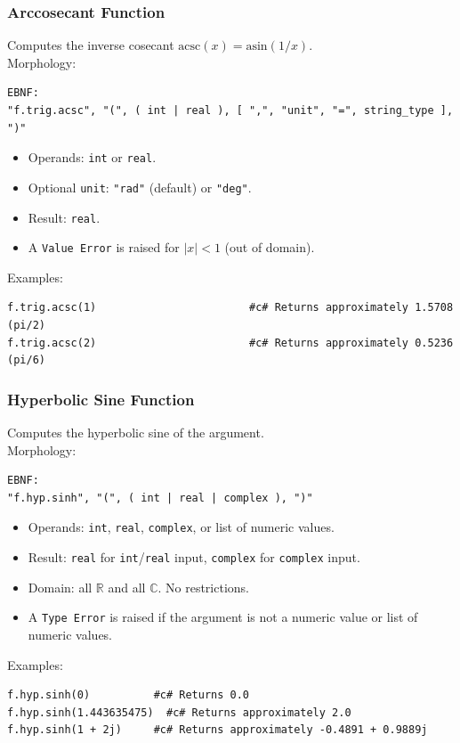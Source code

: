 \subsubsection{Arccosecant Function}
Computes the inverse cosecant $\text{acsc}(x) = \text{asin}(1/x)$. \\
Morphology:
\begin{verbatim}
EBNF:
"f.trig.acsc", "(", ( int | real ), [ ",", "unit", "=", string_type ], ")"
\end{verbatim}
\begin{itemize}
\item Operands: \texttt{int} or \texttt{real}.
\item Optional \texttt{unit}: \texttt{"rad"} (default) or \texttt{"deg"}.
\item Result: \texttt{real}.
\item A \texttt{Value Error} is raised for $|x| < 1$ (out of domain).
\end{itemize}
Examples:
\begin{verbatim}
f.trig.acsc(1)                        #c# Returns approximately 1.5708 (pi/2)
f.trig.acsc(2)                        #c# Returns approximately 0.5236 (pi/6)
\end{verbatim}

\subsubsection{Hyperbolic Sine Function}
Computes the hyperbolic sine of the argument. \\
Morphology:
\begin{verbatim}
EBNF:
"f.hyp.sinh", "(", ( int | real | complex ), ")"
\end{verbatim}
\begin{itemize}
\item Operands: \texttt{int}, \texttt{real}, \texttt{complex}, or list of numeric values.
\item Result: \texttt{real} for \texttt{int}/\texttt{real} input, \texttt{complex} for \texttt{complex} input.
\item Domain: all $\mathbb{R}$ and all $\mathbb{C}$. No restrictions.
\item A \texttt{Type Error} is raised if the argument is not a numeric value or list of numeric values.
\end{itemize}
Examples:
\begin{verbatim}
f.hyp.sinh(0)          #c# Returns 0.0
f.hyp.sinh(1.443635475)  #c# Returns approximately 2.0
f.hyp.sinh(1 + 2j)     #c# Returns approximately -0.4891 + 0.9889j
\end{verbatim}

